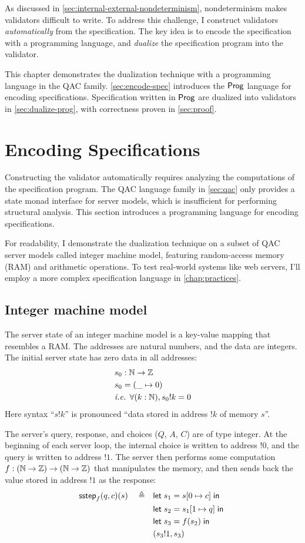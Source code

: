 As discussed in \autoref{sec:internal-external-nondeterminism}, nondeterminism
makes validators difficult to write.  To address this challenge, I construct
validators {\em automatically} from the specification.  The key idea is to
encode the specification with a programming language, and {\em dualize} the
specification program into the validator.

This chapter demonstrates the dualization technique with a programming language
in the QAC family.  \autoref{sec:encode-spec} introduces the $\mathsf{Prog}$ language
for encoding specifications.  Specification written in $\mathsf{Prog}$ are dualized into
validators in \autoref{sec:dualize-prog}, with correctness proven in
\autoref{sec:proof}.

\section{Encoding Specifications}
\label{sec:encode-spec}
Constructing the validator automatically requires analyzing the computations of
the specification program.  The QAC language family in \autoref{sec:qac} only
provides a state monad interface for server models, which is insufficient for
performing structural analysis.  This section introduces a programming language
for encoding specifications.

For readability, I demonstrate the dualization technique on a subset of QAC
server models called integer machine model, featuring random-access memory (RAM)
and arithmetic operations.  To test real-world systems like web servers, I'll
employ a more complex specification language in \autoref{chap:practices}.

\subsection{Integer machine model}
The server state of an integer machine model is a key-value mapping that
resembles a RAM.  The addresses are natural numbers, and the data are integers.
The initial server state has zero data in all addresses:
\begin{align*}
  &s_0:\mathbb N\to\mathbb Z\\
  &s_0=(\_\mapsto0)\\
  &\textit{i.e. }\forall (k:\mathbb N), s_0!k=0
\end{align*}
Here syntax ``$s!k$'' is pronounced ``data stored in address $!k$ of memory
$s$''.

The server's query, response, and choices ($Q$, $A$, $C$) are of type integer.
At the beginning of each server loop, the internal choice is written to address
$!0$, and the query is written to address $!1$.  The server then performs some
computation $f:(\mathbb N\to\mathbb Z)\to(\mathbb N\to\mathbb Z)$ that manipulates the memory, and
then sends back the value stored in address $!1$ as the response:
\begin{align*}
  \mathsf{sstep}_f(q,c)(s)\quad\triangleq\quad&\mathsf{let}\; s_1=s[0\mapsto c]\;\mathsf{in}\;\\
  &\mathsf{let}\; s_2=s_1[1\mapsto q]\;\mathsf{in}\;\\
  &\mathsf{let}\; s_3=f(s_2)\;\mathsf{in}\;\\
  &(s_3!1,s_3)
\end{align*}


